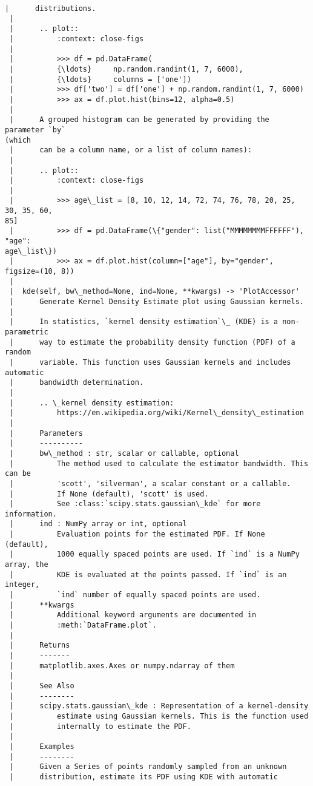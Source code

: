 \documentclass[11pt]{article}
\begin{document}
\begin{Verbatim}[commandchars=\\\{\}]
 |      distributions.
 |
 |      .. plot::
 |          :context: close-figs
 |
 |          >>> df = pd.DataFrame(
 |          {\ldots}     np.random.randint(1, 7, 6000),
 |          {\ldots}     columns = ['one'])
 |          >>> df['two'] = df['one'] + np.random.randint(1, 7, 6000)
 |          >>> ax = df.plot.hist(bins=12, alpha=0.5)
 |
 |      A grouped histogram can be generated by providing the parameter `by`
(which
 |      can be a column name, or a list of column names):
 |
 |      .. plot::
 |          :context: close-figs
 |
 |          >>> age\_list = [8, 10, 12, 14, 72, 74, 76, 78, 20, 25, 30, 35, 60,
85]
 |          >>> df = pd.DataFrame(\{"gender": list("MMMMMMMMFFFFFF"), "age":
age\_list\})
 |          >>> ax = df.plot.hist(column=["age"], by="gender", figsize=(10, 8))
 |
 |  kde(self, bw\_method=None, ind=None, **kwargs) -> 'PlotAccessor'
 |      Generate Kernel Density Estimate plot using Gaussian kernels.
 |
 |      In statistics, `kernel density estimation`\_ (KDE) is a non-parametric
 |      way to estimate the probability density function (PDF) of a random
 |      variable. This function uses Gaussian kernels and includes automatic
 |      bandwidth determination.
 |
 |      .. \_kernel density estimation:
 |          https://en.wikipedia.org/wiki/Kernel\_density\_estimation
 |
 |      Parameters
 |      ----------
 |      bw\_method : str, scalar or callable, optional
 |          The method used to calculate the estimator bandwidth. This can be
 |          'scott', 'silverman', a scalar constant or a callable.
 |          If None (default), 'scott' is used.
 |          See :class:`scipy.stats.gaussian\_kde` for more information.
 |      ind : NumPy array or int, optional
 |          Evaluation points for the estimated PDF. If None (default),
 |          1000 equally spaced points are used. If `ind` is a NumPy array, the
 |          KDE is evaluated at the points passed. If `ind` is an integer,
 |          `ind` number of equally spaced points are used.
 |      **kwargs
 |          Additional keyword arguments are documented in
 |          :meth:`DataFrame.plot`.
 |
 |      Returns
 |      -------
 |      matplotlib.axes.Axes or numpy.ndarray of them
 |
 |      See Also
 |      --------
 |      scipy.stats.gaussian\_kde : Representation of a kernel-density
 |          estimate using Gaussian kernels. This is the function used
 |          internally to estimate the PDF.
 |
 |      Examples
 |      --------
 |      Given a Series of points randomly sampled from an unknown
 |      distribution, estimate its PDF using KDE with automatic

\end{Verbatim}
\end{document}

